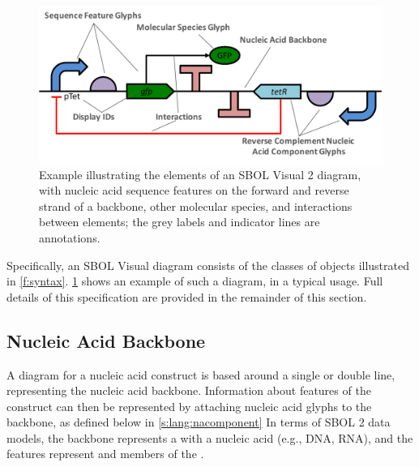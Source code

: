 \begin{figure}[h!]
\centering
\includegraphics[width=6in]{figures/SBOLgeneral.pdf}
\caption{Example illustrating the elements of an SBOL Visual 2 diagram, with nucleic acid sequence features on the forward and reverse strand of a backbone, other molecular species, and interactions between elements; the grey labels and indicator lines are annotations.}
\label{f:example}
\end{figure}

Specifically, an SBOL Visual diagram consists of the classes of objects illustrated in \ref{f:syntax}.
\ref{f:example} shows an example of such a diagram, in a typical usage.
Full details of this specification are provided in the remainder of this section.


\subsection{Nucleic Acid Backbone}
\label{s:lang:backbone}

A diagram for a nucleic acid construct is based around a single or double line, representing the nucleic acid backbone. 
Information about features of the construct can then be represented by attaching nucleic acid glyphs to the backbone, as defined below in \ref{s:lang:nacomponent}
%
In terms of SBOL 2 data models, the backbone represents a  with a nucleic acid  (e.g., DNA, RNA), and the features represent  and  members of the .

